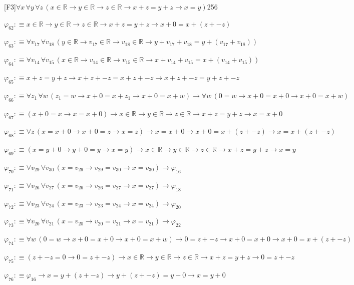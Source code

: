 \begin{fullproof}{[F3]}{$\forall x\,\forall y\,\forall z\,(x \in \mathbb{R} \to y \in \mathbb{R} \to z \in \mathbb{R} \to x + z = y + z \to x = y)$}{256}
\begin{abbrevlist}
\item $\varphi_{62} :\equiv x \in \mathbb{R} \to y \in \mathbb{R} \to z \in \mathbb{R} \to x + z = y + z \to x + 0 = x + (z + -z)$
\item $\varphi_{63} :\equiv \forall v_{17}\,\forall v_{18}\,(y \in \mathbb{R} \to v_{17} \in \mathbb{R} \to v_{18} \in \mathbb{R} \to y + v_{17} + v_{18} = y + (v_{17} + v_{18}))$
\item $\varphi_{64} :\equiv \forall v_{14}\,\forall v_{15}\,(x \in \mathbb{R} \to v_{14} \in \mathbb{R} \to v_{15} \in \mathbb{R} \to x + v_{14} + v_{15} = x + (v_{14} + v_{15}))$
\item $\varphi_{65} :\equiv x + z = y + z \to x + z + -z = x + z + -z \to x + z + -z = y + z + -z$
\item $\varphi_{66} :\equiv \forall z_{1}\,\forall w\,(z_{1} = w \to x + 0 = x + z_{1} \to x + 0 = x + w) \to \forall w\,(0 = w \to x + 0 = x + 0 \to x + 0 = x + w)$
\item $\varphi_{67} :\equiv (x + 0 = x \to x = x + 0) \to x \in \mathbb{R} \to y \in \mathbb{R} \to z \in \mathbb{R} \to x + z = y + z \to x = x + 0$
\item $\varphi_{68} :\equiv \forall z\,(x = x + 0 \to x + 0 = z \to x = z) \to x = x + 0 \to x + 0 = x + (z + -z) \to x = x + (z + -z)$
\item $\varphi_{69} :\equiv (x = y + 0 \to y + 0 = y \to x = y) \to x \in \mathbb{R} \to y \in \mathbb{R} \to z \in \mathbb{R} \to x + z = y + z \to x = y$
\item $\varphi_{70} :\equiv \forall v_{29}\,\forall v_{30}\,(x = v_{29} \to v_{29} = v_{30} \to x = v_{30}) \to \varphi_{16}$
\item $\varphi_{71} :\equiv \forall v_{26}\,\forall v_{27}\,(x = v_{26} \to v_{26} = v_{27} \to x = v_{27}) \to \varphi_{18}$
\item $\varphi_{72} :\equiv \forall v_{23}\,\forall v_{24}\,(x = v_{23} \to v_{23} = v_{24} \to x = v_{24}) \to \varphi_{20}$
\item $\varphi_{73} :\equiv \forall v_{20}\,\forall v_{21}\,(x = v_{20} \to v_{20} = v_{21} \to x = v_{21}) \to \varphi_{22}$
\item $\varphi_{74} :\equiv \forall w\,(0 = w \to x + 0 = x + 0 \to x + 0 = x + w) \to 0 = z + -z \to x + 0 = x + 0 \to x + 0 = x + (z + -z)$
\item $\varphi_{75} :\equiv (z + -z = 0 \to 0 = z + -z) \to x \in \mathbb{R} \to y \in \mathbb{R} \to z \in \mathbb{R} \to x + z = y + z \to 0 = z + -z$
\item $\varphi_{76} :\equiv \varphi_{16} \to x = y + (z + -z) \to y + (z + -z) = y + 0 \to x = y + 0$

\end{abbrevlist}
\end{fullproof}
